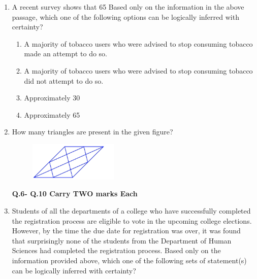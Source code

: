 \documentclass[12pt]{article}
\theoremstyle{remark}
\begin{document}
\begin{enumerate}
\begin{enumerate}
 \end{enumerate}
\hfill{}
\item A recent survey shows that 65%
Based only on the information in the above passage, which one of the following options can be logically inferred with certainty?
\begin{enumerate}
\item A majority of tobacco users who were advised to stop consuming tobacco made an attempt to do so.
\item A majority of tobacco users who were advised to stop consuming tobacco did not attempt to do so.
\item Approximately 30%
\item Approximately 65%
\end{enumerate}
\hfill{}
\item How many triangles are present in the given figure?
\begin{figure}[H]
\centering
\includegraphics[width=0.4\textwidth]{Figs/Q5.png}
\caption{}
\label{fig:3.1}
\end{figure}
\begin{enumerate}  \end{enumerate}
\hfill{}
\newpage
\textbf{Q.6- Q.10 Carry TWO marks Each}
\item Students of all the departments of a college who have successfully completed the registration process are eligible to vote in the upcoming college elections. However, by the time the due date for registration was over, it was found that surprisingly none of the students from the Department of Human Sciences had completed the registration process. Based only on the information provided above, which one of the following sets of statement(s) can be logically inferred with certainty?

\end{enumerate}
\end{document}
